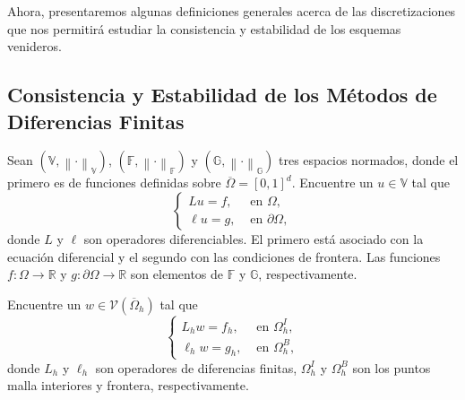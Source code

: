 Ahora, presentaremos algunas definiciones generales acerca de las
discretizaciones que nos permitirá estudiar la consistencia y
estabilidad de los esquemas venideros.

\subsection{Consistencia y Estabilidad de los Métodos de Diferencias Finitas}

Sean
\begin{math}
    \left(
    \mathbb{V},
    {\left\|\cdot\right\|}_{\mathbb{V}}
    \right)
\end{math},
\begin{math}
    \left(
    \mathbb{F},
    {\left\|\cdot\right\|}_{\mathbb{F}}
    \right)
\end{math}
y
\begin{math}
    \left(
    \mathbb{G},
    {\left\|\cdot\right\|}_{\mathbb{G}}
    \right)
\end{math}
tres espacios normados, donde el primero es de funciones definidas
sobre $\overline{\Omega}={\left[0,1\right]}^{d}$.
Encuentre un $u\in\mathbb{V}$ tal que
\begin{equation}\label{eq:boundary_value_problem}
    \begin{cases}
        Lu=f,     & \text{ en }\Omega,         \\
        \ell u=g, & \text{ en }\partial\Omega,
    \end{cases}
\end{equation}
donde $L$ y $\ell$ son operadores diferenciables.
El primero está asociado con la ecuación diferencial y el segundo con
las condiciones de frontera.
Las funciones $f\colon\Omega\to\mathbb{R}$ y
$g\colon\partial\Omega\to\mathbb{R}$
son elementos de $\mathbb{F}$ y $\mathbb{G}$, respectivamente.

Encuentre un $w\in\mathcal{V}\left(\overline{\Omega}_{h}\right)$ tal
que
\begin{equation}\label{eq:boundary_value_problem_finite}
    \begin{cases}
        L_{h}w=f_{h},    & \text{ en }\Omega^{I}_{h}, \\
        \ell_{h}w=g_{h}, & \text{ en }\Omega^{B}_{h},
    \end{cases}
\end{equation}
donde $L_{h}$ y $\ell_{h}$ son operadores de diferencias finitas,
\begin{math}
    \Omega^{I}_{h}
\end{math}
y
\begin{math}
    \Omega^{B}_{h}
\end{math}
son los puntos malla interiores y frontera, respectivamente.

